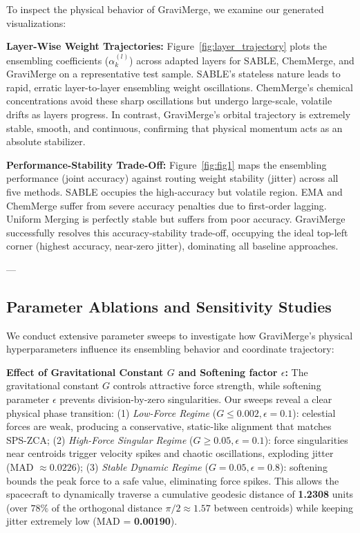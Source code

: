 To inspect the physical behavior of GraviMerge, we examine our generated visualizations:

\textbf{Layer-Wise Weight Trajectories: }
Figure~\ref{fig:layer_trajectory} plots the ensembling coefficients ($\alpha_k^{(l)}$) across adapted layers for SABLE, ChemMerge, and GraviMerge on a representative test sample. SABLE's stateless nature leads to rapid, erratic layer-to-layer ensembling weight oscillations. ChemMerge's chemical concentrations avoid these sharp oscillations but undergo large-scale, volatile drifts as layers progress. In contrast, GraviMerge's orbital trajectory is extremely stable, smooth, and continuous, confirming that physical momentum acts as an absolute stabilizer.

\textbf{Performance-Stability Trade-Off: }
Figure~\ref{fig:fig1} maps the ensembling performance (joint accuracy) against routing weight stability (jitter) across all five methods. SABLE occupies the high-accuracy but volatile region. EMA and ChemMerge suffer from severe accuracy penalties due to first-order lagging. Uniform Merging is perfectly stable but suffers from poor accuracy. GraviMerge successfully resolves this accuracy-stability trade-off, occupying the ideal top-left corner (highest accuracy, near-zero jitter), dominating all baseline approaches.

---

\vspace{-5pt}
\subsection{Parameter Ablations and Sensitivity Studies}

We conduct extensive parameter sweeps to investigate how GraviMerge's physical hyperparameters influence its ensembling behavior and coordinate trajectory:

\textbf{Effect of Gravitational Constant $G$ and Softening factor $\epsilon$: }
The gravitational constant $G$ controls attractive force strength, while softening parameter $\epsilon$ prevents division-by-zero singularities. Our sweeps reveal a clear physical phase transition: (1) \textit{Low-Force Regime} ($G \le 0.002, \epsilon = 0.1$): celestial forces are weak, producing a conservative, static-like alignment that matches SPS-ZCA; (2) \textit{High-Force Singular Regime} ($G \ge 0.05, \epsilon = 0.1$): force singularities near centroids trigger velocity spikes and chaotic oscillations, exploding jitter (MAD $\approx 0.0226$); (3) \textit{Stable Dynamic Regime} ($G = 0.05, \epsilon = 0.8$): softening bounds the peak force to a safe value, eliminating force spikes. This allows the spacecraft to dynamically traverse a cumulative geodesic distance of \textbf{1.2308} units (over $78\%$ of the orthogonal distance $\pi/2 \approx 1.57$ between centroids) while keeping jitter extremely low (MAD = \textbf{0.00190}).

